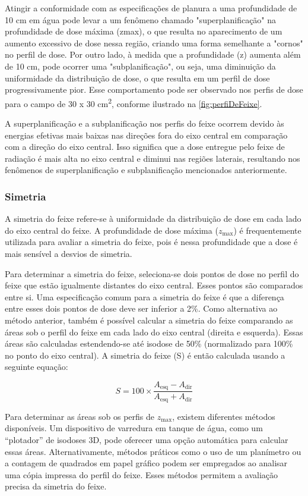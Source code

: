 \documentclass[11pt,a4paper]{article}
\begin{document}
    Atingir a conformidade com as especificações de planura a uma profundidade de 10 cm em água pode levar a um fenômeno chamado "superplanificação" na profundidade de dose máxima (zmax), o que resulta no aparecimento de um aumento excessivo de dose nessa região, criando uma forma semelhante a "cornos" no perfil de dose. Por outro lado, à medida que a profundidade (z) aumenta além de 10 cm, pode ocorrer uma "subplanificação", ou seja, uma diminuição da uniformidade da distribuição de dose, o que resulta em um perfil de dose progressivamente pior. Esse comportamento pode ser observado nos perfis de dose para o campo de 30 x 30 \unit{cm^2}, conforme ilustrado na \ref{fig:perfiDeFeixe}.

    A superplanificação e a subplanificação nos perfis do feixe ocorrem devido às energias efetivas mais baixas nas direções fora do eixo central em comparação com a direção do eixo central. Isso significa que a dose entregue pelo feixe de radiação é mais alta no eixo central e diminui nas regiões laterais, resultando nos fenômenos de superplanificação e subplanificação mencionados anteriormente.

\subsubsection*{Simetria}

    A simetria do feixe refere-se à uniformidade da distribuição de dose em cada lado do eixo central do feixe. A profundidade de dose máxima ($z_{\text{max}}$) é frequentemente utilizada para avaliar a simetria do feixe, pois é nessa profundidade que a dose é mais sensível a desvios de simetria.

    Para determinar a simetria do feixe, seleciona-se dois pontos de dose no perfil do feixe que estão igualmente distantes do eixo central. Esses pontos são comparados entre si. Uma especificação comum para a simetria do feixe é que a diferença entre esses dois pontos de dose deve ser inferior a 2\%.  Como alternativa ao método anterior, também é possível calcular a simetria do feixe comparando as áreas sob o perfil do feixe em cada lado do eixo central (direita e esquerda). Essas áreas são calculadas estendendo-se até isodose de 50\% (normalizado para 100\% no ponto do eixo central). A simetria do feixe (S) é então calculada usando a seguinte equação:

    \begin{equation}
        S = 100 \times \frac{A_{\text{esq}} - A_{\text{dir}}}{A_{\text{esq}} + A_{\text{dir}}}
    \end{equation}

    Para determinar as áreas sob os perfis de $z_{\text{max}}$, existem diferentes métodos disponíveis. Um dispositivo de varredura em tanque de água, como um ``plotador'' de isodoses 3D, pode oferecer uma opção automática para calcular essas áreas. Alternativamente, métodos práticos como o uso de um planímetro ou a contagem de quadrados em papel gráfico podem ser empregados ao analisar uma cópia impressa do perfil do feixe. Esses métodos permitem a avaliação precisa da simetria do feixe.
    

\end{document}
